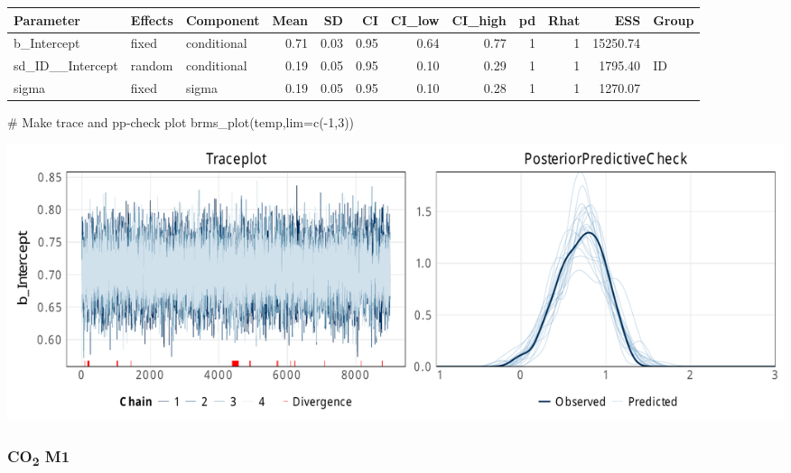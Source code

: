 \documentclass[
  letterpaper,
  DIV=11,
  numbers=noendperiod]{scrartcl}
\newenvironment{Shaded}{\begin{snugshade}}{\end{snugshade}}
\newcommand{\AttributeTok}[1]{\textcolor[rgb]{0.40,0.45,0.13}{#1}}
\newcommand{\CommentTok}[1]{\textcolor[rgb]{0.37,0.37,0.37}{#1}}
\newcommand{\DecValTok}[1]{\textcolor[rgb]{0.68,0.00,0.00}{#1}}
\newcommand{\FunctionTok}[1]{\textcolor[rgb]{0.28,0.35,0.67}{#1}}
\newcommand{\NormalTok}[1]{\textcolor[rgb]{0.00,0.23,0.31}{#1}}
\newcommand{\OtherTok}[1]{\textcolor[rgb]{0.00,0.23,0.31}{#1}}
\newcommand{\SpecialCharTok}[1]{\textcolor[rgb]{0.37,0.37,0.37}{#1}}
\newcommand{\StringTok}[1]{\textcolor[rgb]{0.13,0.47,0.30}{#1}}
\begin{document}
\begin{longtable*}[t]{lllrrrrrrrrl}
\toprule
Parameter & Effects & Component & Mean & SD & CI & CI\_low & CI\_high & pd & Rhat & ESS & Group\\
\midrule
b\_Intercept & fixed & conditional & 0.71 & 0.03 & 0.95 & 0.64 & 0.77 & 1 & 1 & 15250.74 & \\
sd\_ID\_\_Intercept & random & conditional & 0.19 & 0.05 & 0.95 & 0.10 & 0.29 & 1 & 1 & 1795.40 & ID\\
sigma & fixed & sigma & 0.19 & 0.05 & 0.95 & 0.10 & 0.28 & 1 & 1 & 1270.07 & \\
\bottomrule
\end{longtable*}

\begin{Shaded}
\begin{Highlighting}[]
\CommentTok{\# Make trace and pp{-}check plot}
\FunctionTok{brms\_plot}\NormalTok{(temp,}\AttributeTok{lim=}\FunctionTok{c}\NormalTok{(}\SpecialCharTok{{-}}\DecValTok{1}\NormalTok{,}\DecValTok{3}\NormalTok{))}
\end{Highlighting}
\end{Shaded}

\includegraphics{supplement_files/figure-pdf/h1bM0CO2-1.pdf}

\subsubsection{\texorpdfstring{CO\textsubscript{2}
M1}{CO2 M1}}\label{co2-m1-1}

\begin{Shaded}
\end{Shaded}
\end{document}
